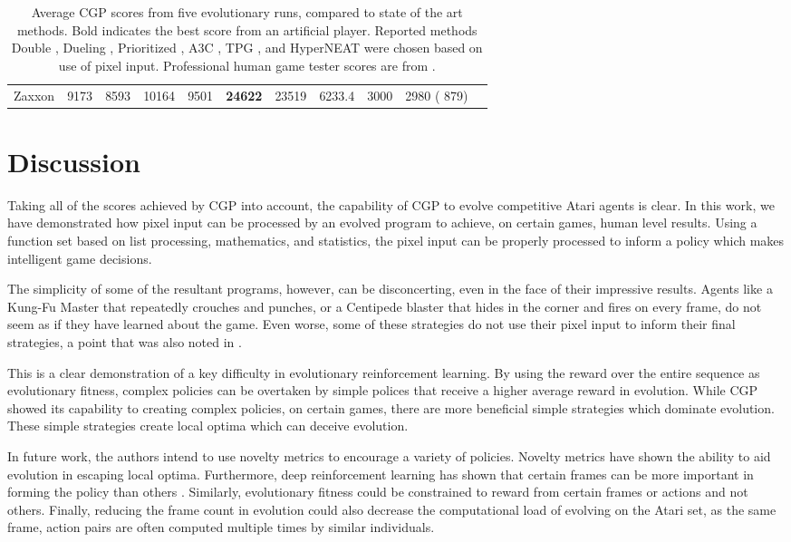 \documentclass[sigconf,screen]{acmart}\settopmatter{printfolios=true,printacmref=false}
\begin{document}
\begin{table*}[t]
{\begin{tabular}{l l l l l l l l l l l}
Zaxxon & 9173 & 8593 & 10164 & 9501 & \textbf{24622} & 23519 & 6233.4 & 3000 & 2980 {\tiny( 879)}\\
  \end{tabular}
  }
  \caption{Average CGP scores from five  evolutionary runs, compared
    to state of the art methods. Bold indicates the best score from an
    artificial player. Reported methods Double \cite{van2016deep}, Dueling
    \cite{wang2015dueling}, Prioritized \cite{schaul2015prioritized}, A3C
    \cite{mnih2016asynchronous}, TPG \cite{kelly2017emergent}, and HyperNEAT
    \cite{hausknecht2014neuroevolution} were chosen based on use of pixel input.
    Professional human game tester scores are from \citet{mnih2013playing}.}
  \label{tab:state}
\end{table*}
 \section{Discussion}
\label{sec:discussion}

Taking all of the scores achieved by CGP into account, the capability of CGP to
evolve competitive Atari agents is clear. In this work, we have demonstrated how
pixel input can be processed by an evolved program to achieve, on certain games,
human level results. Using a function set based on list processing, mathematics,
and statistics, the pixel input can be properly processed to inform a policy
which makes intelligent game decisions.

The simplicity of some of the resultant programs, however, can be disconcerting,
even in the face of their impressive results. Agents like a Kung-Fu Master that
repeatedly crouches and punches, or a Centipede blaster that hides in the corner
and fires on every frame, do not seem as if they have learned about the game.
Even worse, some of these strategies do not use their pixel input to inform
their final strategies, a point that was also noted in
\citet{hausknecht2014neuroevolution}.

This is a clear demonstration of a key difficulty in evolutionary reinforcement
learning. By using the reward over the entire sequence as evolutionary fitness,
complex policies can be overtaken by simple polices that receive a higher
average reward in evolution. While CGP showed its capability to creating complex
policies, on certain games, there are more beneficial simple strategies which
dominate evolution. These simple strategies create local optima which can
deceive evolution.

In future work, the authors intend to use novelty metrics to encourage a variety
of policies. Novelty metrics have shown the ability to aid evolution in escaping
local optima. \cite{lehman2008exploiting} Furthermore, deep reinforcement
learning has shown that certain frames can be more important in forming the
policy than others \cite{schaul2015prioritized}. Similarly, evolutionary fitness
could be constrained to reward from certain frames or actions and not others.
Finally, reducing the frame count in evolution could also decrease the
computational load of evolving on the Atari set, as the same frame, action pairs
are often computed multiple times by similar individuals.
\end{document}
